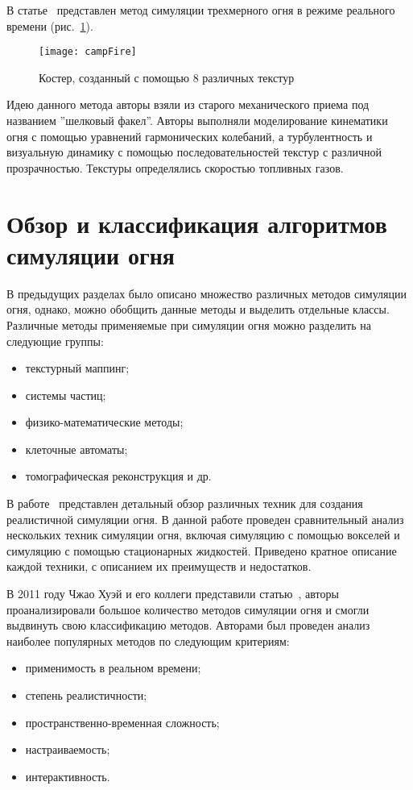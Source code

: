В статье~\cite{SpringMass} представлен метод симуляции трехмерного огня в режиме
реального времени (рис.~\ref{fig:campFire}).
\begin{figure}[htb]
	\centering
    \texttt{[image: campFire]}
    \caption{Костер, созданный с помощью 8 различных текстур}%
    \label{fig:campFire}
\end{figure}
Идею данного метода авторы взяли из старого механического приема под названием
''шелковый факел''. Авторы выполняли моделирование кинематики огня с помощью
уравнений гармонических колебаний, а турбулентность и визуальную динамику с
помощью последовательностей текстур с различной прозрачностью. Текстуры
определялись скоростью топливных газов.

\section{Обзор и классификация алгоритмов симуляции огня}

В предыдущих разделах было описано множество различных методов симуляции огня,
однако, можно обобщить данные методы и выделить отдельные классы. Различные
методы применяемые при симуляции огня можно разделить на следующие
группы:
\begin{itemize}
	\item текстурный маппинг;
	\item системы частиц;
	\item физико-математические методы;
	\item клеточные автоматы;
	\item томографическая реконструкция и др.
\end{itemize}

В работе~\cite{realistic_sim} представлен детальный обзор различных техник для
создания реалистичной симуляции огня. В данной работе проведен сравнительный
анализ нескольких техник симуляции огня, включая симуляцию с помощью вокселей и
симуляцию с помощью стационарных жидкостей. Приведено кратное описание каждой
техники, с описанием их преимуществ и недостатков.

В 2011 году Чжао Хуэй и его коллеги представили статью~\cite{survey}, авторы
проанализировали большое количество методов симуляции огня и смогли выдвинуть
свою классификацию методов. Авторами был проведен анализ наиболее популярных
методов по следующим критериям:
\begin{itemize}
	\item применимость в реальном времени;
	\item степень реалистичности;
	\item пространственно-временная сложность;
	\item настраиваемость;
	\item интерактивность.
\end{itemize}

